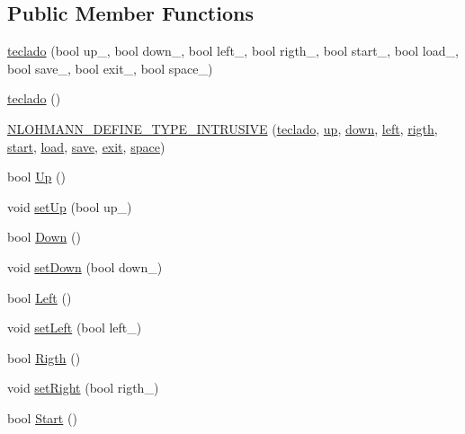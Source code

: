 \subsection*{Public Member Functions}
\begin{DoxyCompactItemize}
\item 
\hyperlink{classteclado_a3e82b46da4544a6c81b358053ef8a447}{teclado} (bool up\+\_\+, bool down\+\_\+, bool left\+\_\+, bool rigth\+\_\+, bool start\+\_\+, bool load\+\_\+, bool save\+\_\+, bool exit\+\_\+, bool space\+\_\+)
\item 
\hyperlink{classteclado_abc02334465faad5f282688aa75e33163}{teclado} ()
\item 
\hyperlink{classteclado_ac5edf7c39f20c671497bf25d655171b3}{N\+L\+O\+H\+M\+A\+N\+N\+\_\+\+D\+E\+F\+I\+N\+E\+\_\+\+T\+Y\+P\+E\+\_\+\+I\+N\+T\+R\+U\+S\+I\+VE} (\hyperlink{classteclado}{teclado}, \hyperlink{classteclado_a74a37a3c06db1e530c2da93c16c2d820}{up}, \hyperlink{classteclado_a1fd914ff92bee012b6aabe48bd7725f4}{down}, \hyperlink{classteclado_a5322f750a38a41e0c252b450592cb606}{left}, \hyperlink{classteclado_a7bffbb3212dd8ddc7a4acff8a5e830e9}{rigth}, \hyperlink{classteclado_a6c14e3a2dbae6bda094ae925e341edf0}{start}, \hyperlink{classteclado_acfdc58aa2a9455f551659c6cd59f92fd}{load}, \hyperlink{classteclado_a4f469df852c3dd6ff88e0ec6babe1965}{save}, \hyperlink{classteclado_a51f4be6dc4ff0b012c41bb2b0380a9d5}{exit}, \hyperlink{classteclado_a4b4ccb376875a14e2b3962a407994c8b}{space})
\item 
bool \hyperlink{classteclado_a54d03375e2ea88b5680ed6b4ad1fe186}{Up} ()
\item 
void \hyperlink{classteclado_a87fd44e8682fa6e5697cce8e5ebef1b6}{set\+Up} (bool up\+\_\+)
\item 
bool \hyperlink{classteclado_a8e8dee9f55a4e06684ec0ab21926c902}{Down} ()
\item 
void \hyperlink{classteclado_a583f420ee67f17b14b2fd467f2692e28}{set\+Down} (bool down\+\_\+)
\item 
bool \hyperlink{classteclado_ae5bf7dd52b8143a12bcac7de5502fdab}{Left} ()
\item 
void \hyperlink{classteclado_a41b1e2ca404c7e7465fdc499edca1853}{set\+Left} (bool left\+\_\+)
\item 
bool \hyperlink{classteclado_ae7e3c197d7bbd96462d27c916c798af5}{Rigth} ()
\item 
void \hyperlink{classteclado_a9d853409774403640cf4581e2b72d918}{set\+Right} (bool rigth\+\_\+)
\item 
bool \hyperlink{classteclado_a5faa65ca224b2667563703f3402a1b87}{Start} ()

\end{DoxyCompactItemize}
